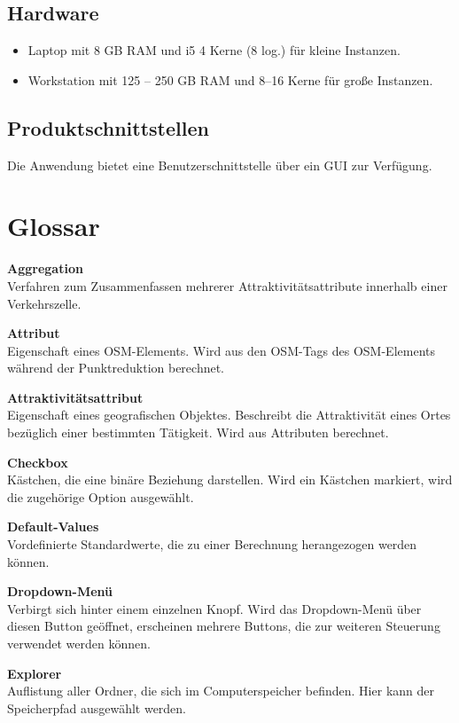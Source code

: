 \documentclass[parskip=full]{scrartcl} %
\begin{document}
\subsection{Hardware}
\begin{itemize}
    \item Laptop mit 8 GB RAM und i5 4 Kerne (8 log.) für kleine Instanzen.
    \item Workstation mit 125 – 250 GB RAM und 8–16 Kerne für große Instanzen.
\end{itemize}

\subsection{Produktschnittstellen}
Die Anwendung bietet eine Benutzerschnittstelle über ein GUI zur Verfügung.
\newpage





\section{Glossar}

\textbf{Aggregation}\\
Verfahren zum Zusammenfassen mehrerer Attraktivitätsattribute innerhalb einer Verkehrszelle.

\textbf{Attribut}\\
Eigenschaft eines OSM-Elements. Wird aus den OSM-Tags des OSM-Elements während der Punktreduktion berechnet.


\textbf{Attraktivitätsattribut}\\
Eigenschaft eines geografischen Objektes. Beschreibt die Attraktivität eines Ortes bezüglich einer bestimmten Tätigkeit. Wird aus Attributen berechnet.

\textbf{Checkbox}\\
Kästchen, die eine binäre Beziehung darstellen. Wird ein Kästchen markiert, wird die zugehörige Option ausgewählt.

\textbf{Default-Values}\\
Vordefinierte Standardwerte, die zu einer Berechnung herangezogen werden können.

\textbf{Dropdown-Menü}\\
Verbirgt sich hinter einem einzelnen Knopf. Wird das Dropdown-Menü über diesen Button geöffnet, erscheinen mehrere Buttons, die zur weiteren Steuerung verwendet werden können.

\textbf{Explorer}\\
Auflistung aller Ordner, die sich im Computerspeicher befinden. Hier kann der Speicherpfad ausgewählt werden.
\end{document}
